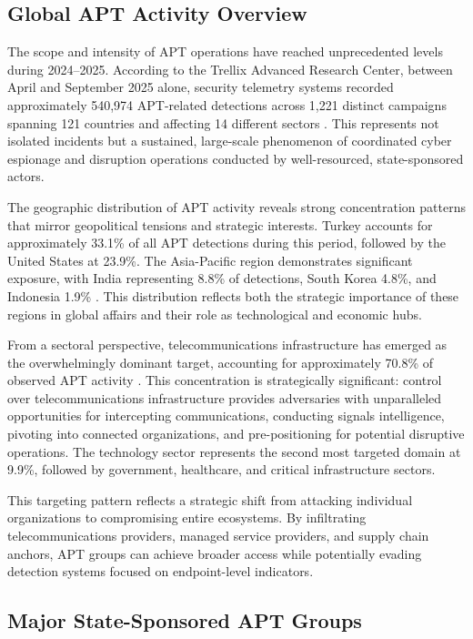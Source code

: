 \subsection{Global APT Activity Overview}

The scope and intensity of APT operations have reached unprecedented levels during 2024--2025. According to the Trellix Advanced Research Center, between April and September 2025 alone, security telemetry systems recorded approximately 540,974 APT-related detections across 1,221 distinct campaigns spanning 121 countries and affecting 14 different sectors \cite{trellix2025}. This represents not isolated incidents but a sustained, large-scale phenomenon of coordinated cyber espionage and disruption operations conducted by well-resourced, state-sponsored actors.

The geographic distribution of APT activity reveals strong concentration patterns that mirror geopolitical tensions and strategic interests. Turkey accounts for approximately 33.1\% of all APT detections during this period, followed by the United States at 23.9\%. The Asia-Pacific region demonstrates significant exposure, with India representing 8.8\% of detections, South Korea 4.8\%, and Indonesia 1.9\% \cite{trellix2025}. This distribution reflects both the strategic importance of these regions in global affairs and their role as technological and economic hubs.

From a sectoral perspective, telecommunications infrastructure has emerged as the overwhelmingly dominant target, accounting for approximately 70.8\% of observed APT activity \cite{trellix2025}. This concentration is strategically significant: control over telecommunications infrastructure provides adversaries with unparalleled opportunities for intercepting communications, conducting signals intelligence, pivoting into connected organizations, and pre-positioning for potential disruptive operations. The technology sector represents the second most targeted domain at 9.9\%, followed by government, healthcare, and critical infrastructure sectors.

This targeting pattern reflects a strategic shift from attacking individual organizations to compromising entire ecosystems. By infiltrating telecommunications providers, managed service providers, and supply chain anchors, APT groups can achieve broader access while potentially evading detection systems focused on endpoint-level indicators.

\subsection{Major State-Sponsored APT Groups}

